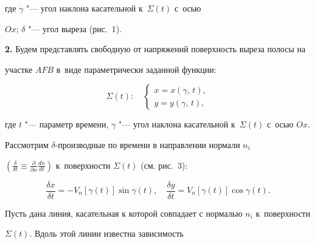 где $\gamma $ "--- угол наклона касательной к~$\Sigma \left( t \right)$ с~осью 

$Ox$; $\delta $ "--- угол выреза (рис.~1).



\textbf{2.} Будем представлять свободную от напряжений поверхность выреза полосы на 

участке $AFB$ в~виде параметрически заданной функции:





\begin{equation}

\label{khromov:eq10}

\Sigma \left( t \right):\quad \left\{ {\begin{array}{l}

 x = x\left( {\gamma,\,t} \right), \\ 

 y = y\left( {\gamma,\, t} \right),

 \end{array}} \right.

\end{equation}

где $t$ "--- параметр времени, $\gamma $ "--- угол наклона касательной к~$\Sigma 

\left( t \right)$ с~осью $Ox$. 



Рассмотрим $\delta $-производные по времени в направлении нормали $n_i $ 

$\left( {\frac{\delta }{\delta t} \equiv \frac{\partial }{\partial 

n}\frac{dn}{dt}} \right)$ к~поверхности $\Sigma \left( t \right)$ (см. рис.~3): 

\begin{equation}

\label{khromov:eq11}

\frac{\delta x}{\delta t} = - V_n \left[ {\gamma \left( t \right)} 

\right]\sin \gamma \left( t \right),\quad \frac{\delta y}{\delta t} = V_n 

\left[ {\gamma \left( t \right)} \right]\cos \gamma \left( t \right).

\end{equation}



Пусть дана линия, касательная к которой совпадает с нормалью $n_i $ к~поверхности 

$\Sigma \left( t \right)$. Вдоль этой линии известна зависимость 

